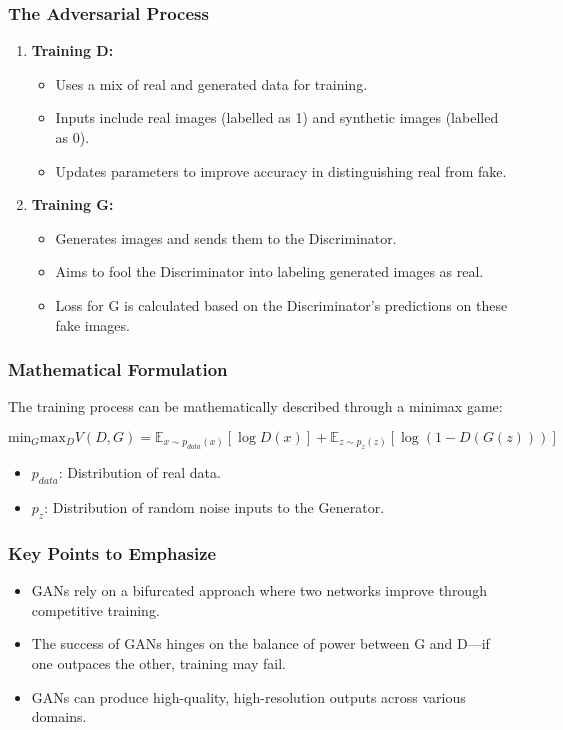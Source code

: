 \documentclass[aspectratio=169]{beamer}
\begin{document}
\begin{frame}[fragile]
    \frametitle{The Adversarial Process}
    \begin{enumerate}
        \item \textbf{Training D:}
            \begin{itemize}
                \item Uses a mix of real and generated data for training.
                \item Inputs include real images (labelled as 1) and synthetic images (labelled as 0).
                \item Updates parameters to improve accuracy in distinguishing real from fake.
            \end{itemize}
        
        \item \textbf{Training G:}
            \begin{itemize}
                \item Generates images and sends them to the Discriminator.
                \item Aims to fool the Discriminator into labeling generated images as real.
                \item Loss for G is calculated based on the Discriminator's predictions on these fake images.
            \end{itemize}
    \end{enumerate}
\end{frame}

\begin{frame}[fragile]
    \frametitle{Mathematical Formulation}
    The training process can be mathematically described through a minimax game:
    
    \begin{equation}
    \text{min}_G \text{max}_D V(D, G) = \mathbb{E}_{x \sim p_{data}(x)} [\log D(x)] + \mathbb{E}_{z \sim p_z(z)} [\log (1 - D(G(z)))]
    \end{equation}
    
    \begin{itemize}
        \item \( p_{data} \): Distribution of real data.
        \item \( p_z \): Distribution of random noise inputs to the Generator.
    \end{itemize}
\end{frame}

\begin{frame}[fragile]
    \frametitle{Key Points to Emphasize}
    \begin{itemize}
        \item GANs rely on a bifurcated approach where two networks improve through competitive training.
        \item The success of GANs hinges on the balance of power between G and D—if one outpaces the other, training may fail.
        \item GANs can produce high-quality, high-resolution outputs across various domains.
    \end{itemize}
\end{frame}
\end{document}
